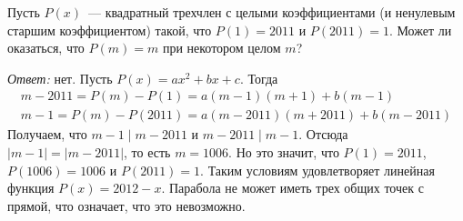 \problem
Пусть $P(x)$~--- квадратный трехчлен с целыми коэффициентами
(и ненулевым старшим коэффициентом) такой, что $P(1) = 2011$ и $P(2011) = 1$.
Может ли оказаться, что $P(m) = m$ при некотором целом $m$?

\solution
\emph{Ответ:} нет.
Пусть $P(x) = a x^2 + b x + c$.
Тогда
\begin{gather*}
    m - 2011 = P(m) - P(1) = a (m - 1) (m + 1) + b (m - 1)
\\
    m - 1 = P(m) - P(2011) = a (m - 2011) (m + 2011) + b (m - 2011)
\end{gather*}
Получаем, что $m - 1 \mid m - 2011$ и $m - 2011 \mid m - 1$.
Отсюда $|m - 1| = |m - 2011|$, то есть $m = 1006$.
Но это значит, что
$P(1) = 2011$, $P(1006) = 1006$ и $P(2011) = 1$.
Таким условиям удовлетворяет линейная функция $P(x) = 2012 - x$.
Парабола не может иметь трех общих точек с прямой, что означает, что это
невозможно.

\endproblem
